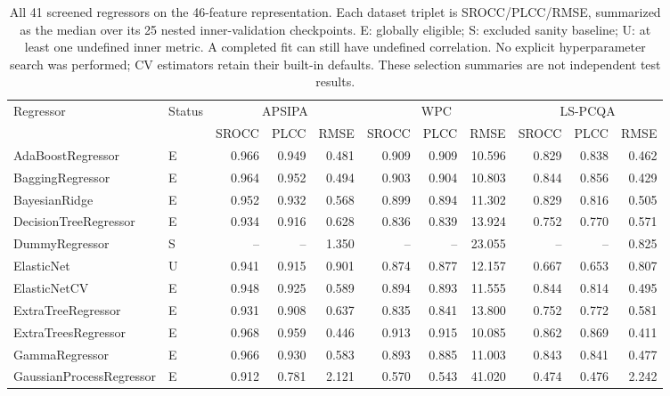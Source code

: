 \documentclass[final,3p,times,twocolumn]{elsarticle}
\begin{document}
\begin{table}[t!]
    \centering
    \caption{All 41 screened regressors on the 46-feature representation. Each dataset triplet is SROCC/PLCC/RMSE, summarized as the median over its 25 nested inner-validation checkpoints. E: globally eligible; S: excluded sanity baseline; U: at least one undefined inner metric. A completed fit can still have undefined correlation. No explicit hyperparameter search was performed; CV estimators retain their built-in defaults. These selection summaries are not independent test results.}
    \label{tab_review_regressors}
    \scriptsize
    \begin{adjustbox}{max width=\textwidth}
        \begin{tabular}{llrrrrrrrrr}
        \toprule
        Regressor & Status & \multicolumn{3}{c}{APSIPA} & \multicolumn{3}{c}{WPC} & \multicolumn{3}{c}{LS-PCQA} \\
        & & SROCC & PLCC & RMSE & SROCC & PLCC & RMSE & SROCC & PLCC & RMSE \\
        \midrule
        AdaBoostRegressor & E & 0.966 & 0.949 & 0.481 & 0.909 & 0.909 & 10.596 & 0.829 & 0.838 & 0.462 \\
        BaggingRegressor & E & 0.964 & 0.952 & 0.494 & 0.903 & 0.904 & 10.803 & 0.844 & 0.856 & 0.429 \\
        BayesianRidge & E & 0.952 & 0.932 & 0.568 & 0.899 & 0.894 & 11.302 & 0.829 & 0.816 & 0.505 \\
        DecisionTreeRegressor & E & 0.934 & 0.916 & 0.628 & 0.836 & 0.839 & 13.924 & 0.752 & 0.770 & 0.571 \\
        DummyRegressor & S & -- & -- & 1.350 & -- & -- & 23.055 & -- & -- & 0.825 \\
        ElasticNet & U & 0.941 & 0.915 & 0.901 & 0.874 & 0.877 & 12.157 & 0.667 & 0.653 & 0.807 \\
        ElasticNetCV & E & 0.948 & 0.925 & 0.589 & 0.894 & 0.893 & 11.555 & 0.844 & 0.814 & 0.495 \\
        ExtraTreeRegressor & E & 0.931 & 0.908 & 0.637 & 0.835 & 0.841 & 13.800 & 0.752 & 0.772 & 0.581 \\
        ExtraTreesRegressor & E & 0.968 & 0.959 & 0.446 & 0.913 & 0.915 & 10.085 & 0.862 & 0.869 & 0.411 \\
        GammaRegressor & E & 0.966 & 0.930 & 0.583 & 0.893 & 0.885 & 11.003 & 0.843 & 0.841 & 0.477 \\
        GaussianProcessRegressor & E & 0.912 & 0.781 & 2.121 & 0.570 & 0.543 & 41.020 & 0.474 & 0.476 & 2.242 \\

\end{tabular}
\end{adjustbox}
\end{table}
\end{document}
